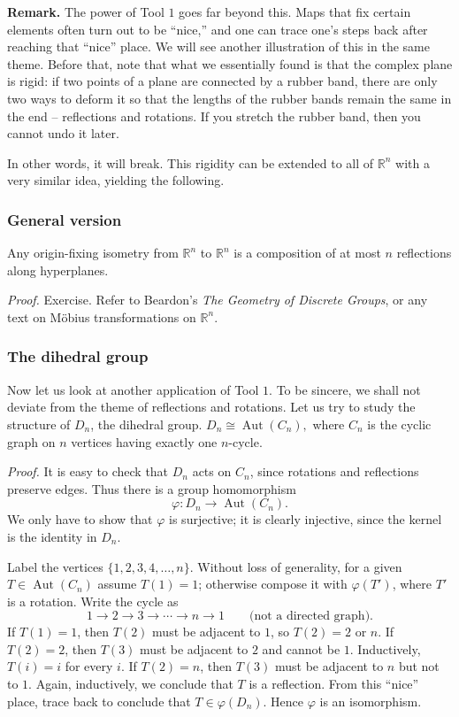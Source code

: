 \documentclass[11pt,a4paper]{article}
\begin{document}
\textbf{Remark.}
The power of Tool $1$ goes far beyond this. Maps that fix certain elements often turn out to be ``nice,'' and one can trace one's steps back after reaching that ``nice'' place. We will see another illustration of this in the same theme. Before that, note that what we essentially found is that the complex plane is rigid: if two points of a plane are connected by a rubber band, there are only two ways to deform it so that the lengths of the rubber bands remain the same in the end -- reflections and rotations. If you stretch the rubber band, then you cannot undo it later.

In other words, it will break. This rigidity can be extended to all of $\mathbb R^n$ with a very similar idea, yielding the following.

\subsubsection*{General version}
Any origin-fixing isometry from $\mathbb R^n$ to $\mathbb R^n$ is a composition of at most $n$ reflections along hyperplanes.

\textit{Proof.}
Exercise. Refer to Beardon's \emph{The Geometry of Discrete Groups}, or any text on M\"obius transformations on $\mathbb R^n$.

\subsubsection*{The dihedral group}
Now let us look at another application of Tool $1$. To be sincere, we shall not deviate from the theme of reflections and rotations. Let us try to study the structure of $D_n$, the dihedral group. \(D_n\cong\operatorname{Aut}(C_n),\) where $C_n$ is the cyclic graph on $n$ vertices having exactly one $n$-cycle.

\textit{Proof.}
It is easy to check that $D_n$ acts on $C_n$, since rotations and reflections preserve edges. Thus there is a group homomorphism
\[
\varphi\colon D_n\longrightarrow\operatorname{Aut}(C_n).
\]
We only have to show that $\varphi$ is surjective; it is clearly injective, since the kernel is the identity in $D_n$.

Label the vertices $\{1,2,3,4,\ldots,n\}$. Without loss of generality, for a given $T\in\operatorname{Aut}(C_n)$ assume $T(1)=1$; otherwise compose it with $\varphi(T')$, where $T'$ is a rotation. Write the cycle as
\[
1\longrightarrow2\longrightarrow3\longrightarrow\cdots
\longrightarrow n\longrightarrow1
\qquad\text{(not a directed graph).}
\]
If $T(1)=1$, then $T(2)$ must be adjacent to $1$, so $T(2)=2$ or $n$. If $T(2)=2$, then $T(3)$ must be adjacent to $2$ and cannot be $1$. Inductively, $T(i)=i$ for every $i$. If $T(2)=n$, then $T(3)$ must be adjacent to $n$ but not to $1$. Again, inductively, we conclude that $T$ is a reflection. From this ``nice'' place, trace back to conclude that $T\in\varphi(D_n)$. Hence $\varphi$ is an isomorphism.
\end{document}
